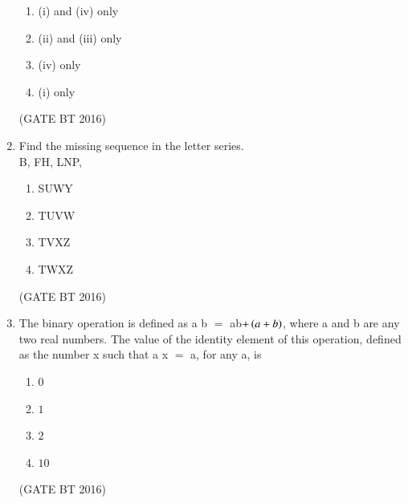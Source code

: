 \documentclass[journal,12pt,onecolumn]{IEEEtran}
\theoremstyle{remark}
\begin{document}
\begin{enumerate}
\begin{multicols}{2}
\begin{enumerate}
\item (i) and (iv) only	
\item  (ii) and (iii) only
\item (iv) only
\item  (i) only

\end{enumerate}
\end{multicols} \hfill(GATE BT 2016)   

\item Find the missing sequence in the letter series.\\
B, FH, LNP,
 \begin{multicols}{4}
\begin{enumerate}
\item  SUWY	
\item TUVW	
\item  TVXZ	
\item TWXZ
\end{enumerate}
\end{multicols} \hfill(GATE BT 2016)   

\item The binary operation   is defined as a   b $=$ ab$+\left(a+b\right)$, where a and b are any two real numbers. The value of the identity element of this operation, defined as the number x such that a   x $=$ a, for any a, is   
\begin{multicols}{4}
\begin{enumerate}
\item $0$
\item $1$	
\item $2$
\item $10$
\end{enumerate}
\end{multicols} \hfill(GATE BT 2016)   


\end{enumerate}
\end{document}
